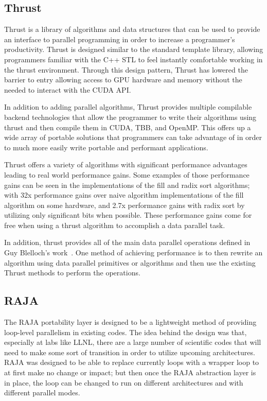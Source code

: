 \subsection*{\textbf{Thrust}}

Thrust is a library of algorithms and data structures that can be used to provide an interface to parallel programming in order to increase a programmer's productivity.
%
Thrust is designed similar to the standard template library, allowing programmers familiar with the C++ STL to feel instantly comfortable working in the thrust environment.
%
Through this design pattern, Thrust has lowered the barrier to entry allowing access to GPU hardware and memory without the needed to interact with the CUDA API.
%
\cite{hoberock2010thrust}

In addition to adding parallel algorithms, Thrust provides multiple compilable backend technologies that allow the programmer to write their algorithms using thrust and then compile them in CUDA, TBB, and OpenMP.
%
This offers up a wide array of portable solutions that programmers can take advantage of in order to much more easily write portable and performant applications.
\cite{thrust}

Thrust offers a variety of algorithms with significant performance advantages leading to real world performance gains.
%
Some examples of those performance gains can be seen in the implementations of the fill and radix sort algorithms; with 32x performance gains over naive algorithm implementations of the fill algorithm on some hardware, and 2.7x performance gains with radix sort by utilizing only significant bits when possible.
%
These performance gains come for free when using a thrust algorithm to accomplish a data parallel task.
%
~\cite{bell2011thrust}

In addition, thrust provides all of the main data parallel operations defined in Guy Blelloch's work~\cite{blelloch1990vector}.
%
One method of achieving performance is to then rewrite an algorithm using data parallel primitives or algorithms and then use the existing Thrust methods to perform the operations.

\subsection*{\textbf{RAJA}}

The RAJA portability layer is designed to be a lightweight method of providing loop-level parallelism in existing codes.
%
The idea behind the design was that, especially at labs like LLNL, there are a large number of scientific codes that will need to make some sort of transition in order to utilize upcoming architectures.
%
RAJA was designed to be able to replace currently loops with a wrapper loop to at first make no change or impact; but then
once the RAJA abstraction layer is in place, the loop can be changed to run on different architectures  and with different parallel modes.
%
\cite{hornung2014raja}
\cite{hornung2016raja}

